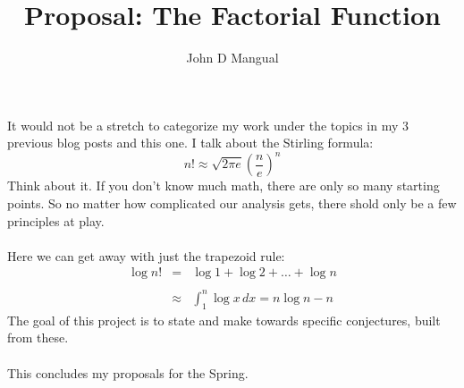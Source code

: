 \documentclass[12pt]{article}
\title{\textbf{Proposal: The Factorial Function}}
\author{John D Mangual}
\date{}
\begin{document}
\selectfont \fontsize{20}{25}\selectfont

\maketitle

\noindent It would not be a stretch to categorize my work under the topics in my 3 previous blog posts and this one.  I talk about the Stirling formula:
$$ n! \approx \sqrt{2 \pi e } \left( \frac{n}{e} \right)^n $$
Think about it.  If you don't know much math, there are only so many starting points.  So no matter how complicated our analysis gets, there shold only be a few principles at play. \\ \\
Here we can get away with just the trapezoid rule:
\begin{eqnarray*} \log n! &=& \log 1 + \log 2 + \dots + \log n \\ \\
& \approx &
\int_1^n \log x \, dx = n \log n - n \end{eqnarray*}
The goal of this project is to state and make towards specific conjectures, built from these. \\ \\
This concludes my proposals for the Spring.

\newpage
\end{document}
